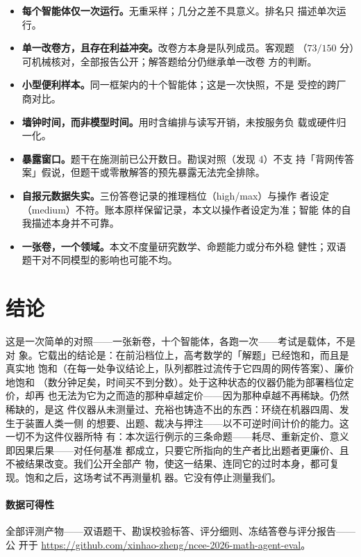 \documentclass[11pt,UTF8]{ctexart}
\theoremstyle{definition}
\begin{document}
\begin{itemize}
  \item \textbf{每个智能体仅一次运行。}无重采样；几分之差不具意义。排名只
        描述单次运行。
  \item \textbf{单一改卷方，且存在利益冲突。}改卷方本身是队列成员。客观题
        （$73/150$ 分）可机械核对，全部报告公开；解答题给分仍继承单一改卷
        方的判断。
  \item \textbf{小型便利样本。}同一框架内的十个智能体；这是一次快照，不是
        受控的跨厂商对比。
  \item \textbf{墙钟时间，而非模型时间。}用时含编排与读写开销，未按服务负
        载或硬件归一化。
  \item \textbf{暴露窗口。}题干在施测前已公开数日。勘误对照（发现 4）不支
        持「背网传答案」假说，但题干或零散解答的预先暴露无法完全排除。
  \item \textbf{自报元数据失实。}三份答卷记录的推理档位（high/max）与操作
        者设定（medium）不符。账本原样保留记录，本文以操作者设定为准；智能
        体的自我描述本身并不可靠。
  \item \textbf{一张卷，一个领域。}本文不度量研究数学、命题能力或分布外稳
        健性；双语题干对不同模型的影响也可能不均。
\end{itemize}

\section{结论}

这是一次简单的对照——一张新卷，十个智能体，各跑一次——考试是载体，不是对
象。它载出的结论是：在前沿档位上，高考数学的「解题」已经饱和，而且是真实地
饱和（在每一处争议结论上，队列都胜过流传于它四周的网传答案）、廉价地饱和
（数分钟足矣，时间买不到分数）。处于这种状态的仪器仍能为部署档位定价，却再
也无法为它为之而造的那种卓越定价——因为那种卓越不再稀缺。仍然稀缺的，是这
件仪器从未测量过、充裕也铸造不出的东西：环绕在机器四周、发生于装置人类一侧
的想要、出题、裁决与押注——以不可逆时间计价的能力。这一切不为这件仪器所特
有：本次运行例示的三条命题——耗尽、重新定价、意义即因果后果——对任何基准
都成立，只要它所指向的生产者比出题者更廉价、且不被结果改变。我们公开全部产
物，使这一结果、连同它的过时本身，都可复现。饱和之后，这场考试不再测量机
器。它没有停止测量我们。

\paragraph*{数据可得性}
全部评测产物——双语题干、勘误校验标答、评分细则、冻结答卷与评分报告——公
开于 \url{https://github.com/xinhao-zheng/ncee-2026-math-agent-eval}。
\end{document}

